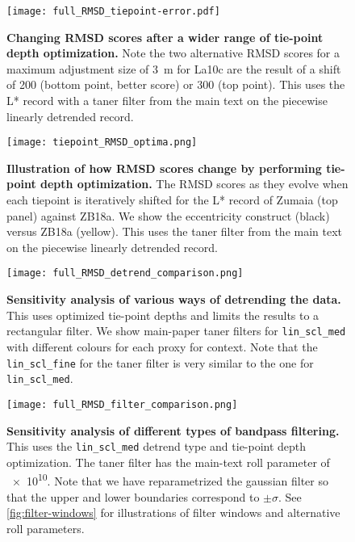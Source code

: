 \documentclass[draft]{agujournal2019}
\begin{document}
\begin{figure}[htb]
  \centering \texttt{[image: full\_RMSD\_tiepoint-error.pdf]}
  \caption{\label{fig:full-RMSD-tie-error}
    \textbf{Changing RMSD scores after a wider range of tie-point depth optimization.}
    Note the two alternative \gls{RMSD} scores for a maximum adjustment size of \qty{3}{\metre} for La10c are the result of a shift of \qty{200}{\kiloyear} (bottom point, better score) or \qty{300}{\kiloyear} (top point).
    This uses the \gls{L*} record with a taner filter from the main text on the piecewise linearly detrended record.
    }
\end{figure}

\begin{figure}[htb]
  \centering \texttt{[image: tiepoint\_RMSD\_optima.png]}
  \caption{\label{fig:tiepoint-RMSD-optima}
    \textbf{Illustration of how RMSD scores change by performing tie-point depth optimization.}
    The \gls{RMSD} scores as they evolve when each tiepoint is iteratively shifted for the \gls{L*} record of Zumaia (top panel) against ZB18a.
    We show the eccentricity construct (black) versus ZB18a (yellow).
    This uses the taner filter from the main text on the piecewise linearly detrended record.
    }
\end{figure}


\begin{figure}[htb]
  \centering \texttt{[image: full\_RMSD\_detrend\_comparison.png]}
  \caption{\label{fig:full-RMSD-detrend}
    \textbf{Sensitivity analysis of various ways of detrending the data.}
    This uses optimized tie-point depths and limits the results to a rectangular filter.
    We show main-paper taner filters for \texttt{lin\_scl\_med} with different colours for each proxy for context.
    Note that the \texttt{lin\_scl\_fine} for the taner filter is very similar to the one for \texttt{lin\_scl\_med}.
    }
\end{figure}

\begin{figure}[htb]
  \centering \texttt{[image: full\_RMSD\_filter\_comparison.png]}
  \caption{\label{fig:full-RMSD-filter}
    \textbf{Sensitivity analysis of different types of bandpass filtering.}
    This uses the \texttt{lin\_scl\_med} detrend type and tie-point depth optimization.
    The taner filter has the main-text roll parameter of \num{e10}.
    Note that we have reparametrized the gaussian filter so that the upper and lower boundaries correspond to \(\pm\sigma\).
    See \cref{fig:filter-windows} for illustrations of filter windows and alternative roll parameters.
    }
\end{figure}
\end{document}
